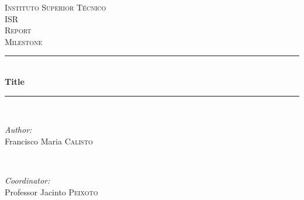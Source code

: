 \begin{titlepage}

\newcommand{\HRule}{\rule{\linewidth}{0.5mm}} %

\center %
 

\textsc{\LARGE Instituto Superior T\'{e}cnico}\\[1.5cm]
\textsc{\Large ISR}\\[0.5cm]
\textsc{\large Report}\\[0.25cm]
\textsc{\small Milestone}\\[0.25cm]


\HRule \\[0.5cm]
{ \large \bfseries Title}\\[0.25cm] %
\HRule \\[0.5cm]
 

\begin{minipage}{0.4\textwidth}
\begin{flushleft} \large
\emph{Author:}\\
Francisco Maria \textsc{Calisto} %
\end{flushleft}
\end{minipage}
~
\begin{minipage}{0.4\textwidth}
\begin{flushright} \large
\emph{Coordinator:} \\
Professor Jacinto \textsc{Peixoto} %
\end{flushright}
\end{minipage}\\[2cm]


\end{titlepage}
